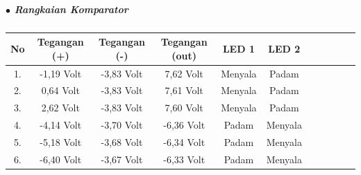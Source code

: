 \documentclass[12pt,a4paper]{article}
\begin{document}
\subparagraph*{$\bullet$ Rangkaian Komparator }
\subparagraph*{ }
\begin{tabular}{|c|c|c|c|c|c|c|c|c|c|c|}        \hline
No & Tegangan (+) & Tegangan (-) & Tegangan (out) & LED 1   & LED 2    \\ \hline 
1. & -1,19 Volt   & -3,83 Volt   & 7,62 Volt      & Menyala & Padam    \\ \hline
2. & 0,64 Volt    & -3,83 Volt   & 7,61 Volt      & Menyala & Padam    \\ \hline
3. & 2,62 Volt    & -3,83 Volt   & 7,60 Volt      & Menyala & Padam    \\ \hline
4. & -4,14 Volt   & -3,70 Volt   & -6,36 Volt     & Padam   & Menyala  \\ \hline
5. & -5,18 Volt   & -3,68 Volt   & -6,34 Volt     & Padam   & Menyala  \\ \hline
6. & -6,40 Volt   & -3,67 Volt   & -6,33 Volt     & Padam   & Menyala  \\ \hline

 \end{tabular}


\newpage
\end{document}
